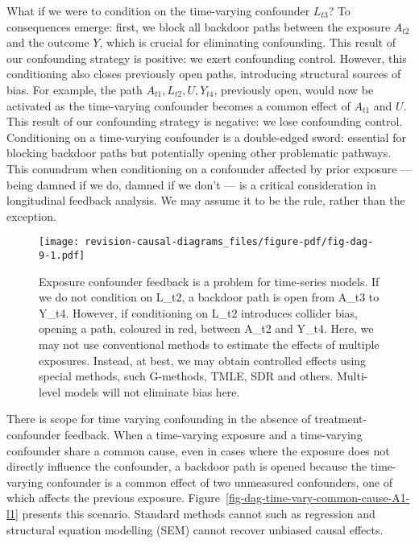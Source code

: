 \documentclass[
  singlecolumn,
  9pt]{article}
\begin{document}
What if we were to condition on the time-varying confounder \(L_{t3}\)?
To consequences emerge: first, we block all backdoor paths between the
exposure \(A_{t2}\) and the outcome \(Y\), which is crucial for
eliminating confounding. This result of our confounding strategy is
positive: we exert confounding control. However, this conditioning also
closes previously open paths, introducing structural sources of bias.
For example, the path \(A_{t1}, L_{t2}, U, Y_{t4}\), previously open,
would now be activated as the time-varying confounder becomes a common
effect of \(A_{t1}\) and \(U\). This result of our confounding strategy
is negative: we lose confounding control. Conditioning on a time-varying
confounder is a double-edged sword: essential for blocking backdoor
paths but potentially opening other problematic pathways. This conundrum
when conditioning on a confounder affected by prior exposure ---being
damned if we do, damned if we don't --- is a critical consideration in
longitudinal feedback analysis. We may assume it to be the rule, rather
than the exception.

\begin{figure}

{\centering \texttt{[image: revision-causal-diagrams\_files/figure-pdf/fig-dag-9-1.pdf]}

}

\caption{\label{fig-dag-9}Exposure confounder feedback is a problem for
time-series models. If we do not condition on L\_t2, a backdoor path is
open from A\_t3 to Y\_t4. However, if conditioning on L\_t2 introduces
collider bias, opening a path, coloured in red, between A\_t2 and Y\_t4.
Here, we may not use conventional methods to estimate the effects of
multiple exposures. Instead, at best, we may obtain controlled effects
using special methods, such G-methods, TMLE, SDR and others. Multi-level
models will not eliminate bias here.}

\end{figure}

There is scope for time varying confounding in the absence of
treatment-confounder feedback. When a time-varying exposure and a
time-varying confounder share a common cause, even in cases where the
exposure does not directly influence the confounder, a backdoor path is
opened because the time-varying confounder is a common effect of two
unmeasured confounders, one of which affects the previous exposure.
Figure~\ref{fig-dag-time-vary-common-cause-A1-l1} presents this
scenario. Standard methods cannot such as regression and structural
equation modelling (SEM) cannot recover unbiased causal effects.
\end{document}

